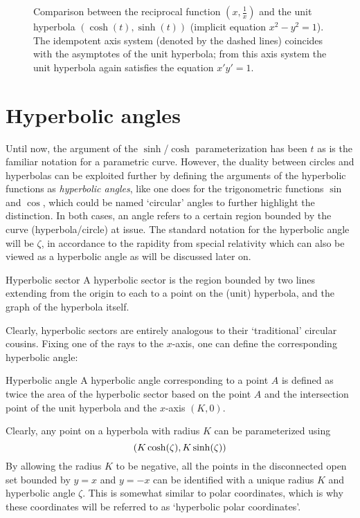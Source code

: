 \begin{figure}[ht]
    \centering
    
    \caption{Comparison between the reciprocal function $(x, \tfrac{1}{x})$ and the unit hyperbola $(\cosh(t), \sinh(t))$ (implicit equation $x^2 - y^2 = 1$). The idempotent axis system (denoted by the dashed lines) coincides with the asymptotes of the unit hyperbola; from this axis system the unit hyperbola again satisfies the equation $x' y' = 1$.}
    \label{fig:hyperbola_comparison}
\end{figure}

\section{Hyperbolic angles}
Until now, the argument of the $\sinh$/$\cosh$ parameterization has been $t$ as is the familiar notation for a parametric curve. However, the duality between circles and hyperbolas can be exploited further by defining the arguments of the hyperbolic functions as \emph{hyperbolic angles}, like one does for the trigonometric functions $\sin$ and $\cos$, which could be named `circular' angles to further highlight the distinction. In both cases, an angle refers to a certain region bounded by the curve (hyperbola/circle) at issue. The standard notation for the hyperbolic angle will be $\zeta$, in accordance to the rapidity from special relativity which can also be viewed as a hyperbolic angle as will be discussed later on. 
\begin{block}{Hyperbolic sector}
A hyperbolic sector is the region bounded by two lines extending from the origin to each to a point on the (unit) hyperbola, and the graph of the hyperbola itself. 
\end{block}
Clearly, hyperbolic sectors are entirely analogous to their `traditional' circular cousins. Fixing one of the rays to the $x$-axis, one can define the corresponding hyperbolic angle:
\begin{block}{Hyperbolic angle}
A hyperbolic angle corresponding to a point $A$ is defined as twice the area of the hyperbolic sector based on the point $A$ and the intersection point of the unit hyperbola and the $x$-axis $(K, 0)$.
\end{block}
Clearly, any point on a hyperbola with radius $K$ can be parameterized using $$\qty(K\cosh(\zeta), K\sinh(\zeta))$$ By allowing the radius $K$ to be negative, all the points in the disconnected open set bounded by $y = x$ and $y = -x$ can be identified with a unique radius $K$ and hyperbolic angle $\zeta$. This is somewhat similar to polar coordinates, which is why these coordinates will be referred to as `hyperbolic polar coordinates'.

